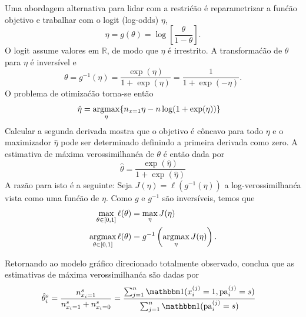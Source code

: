 \begin{exenumerate}
\begin{solution}
        Uma abordagem alternativa para lidar com a restri\'c\~ao \'e
        reparametrizar a fun\'c\~ao objetivo e trabalhar com o logit (log-odds) $\eta$,
        \begin{equation}
            \eta = g(\theta) = \log\left[ \frac{\theta}{1-\theta}\right].
        \end{equation}
        O logit assume valores em $\mathbb{R}$, de modo que $\eta$ \'e
        irrestrito. A transforma\'c\~ao de $\theta$ para $\eta$ \'e
        invers\'ivel e
        \begin{equation}
            \theta = g^{-1}(\eta) = \frac{\exp(\eta)}{1+\exp(\eta)} = \frac{1}{1+\exp(-\eta)}.
        \end{equation}
        O problema de otimiza\'c\~ao torna-se ent\~ao
        \begin{align*}
            \hat{\eta} &= \operatorname*{\mathrm{argmax}}_{\eta}  \{ n_{x=1} \eta - n \log(1+\exp(\eta)) \}
        \end{align*}
        Calcular a segunda derivada mostra que o objetivo \'e c\^oncavo
        para todo $\eta$ e o maximizador $\hat{\eta}$ pode ser determinado
        definindo a primeira derivada como zero. A estimativa de m\'axima
        verossimilhan\'ca de $\theta$ \'e ent\~ao dada por
        \begin{equation}
            \hat{\theta} = \frac{\exp(\hat{\eta})}{1+\exp(\hat{\eta})}
        \end{equation}
        A raz\~ao para isto \'e a seguinte: Seja $J(\eta) = \ell(
        g^{-1}(\eta))$ a log-verossimilhan\'ca vista como uma fun\'c\~ao de
        $\eta$. Como $g$ e $g^{-1}$ s\~ao invers\'iveis, temos que
        \begin{align}
            \max_{\theta \in [0,1]} \ell(\theta) &= \max_\eta J(\eta) \\
            \operatorname*{\mathrm{argmax}}_{\theta \in [0,1]} \ell(\theta) &= g^{-1}\left( \operatorname*{\mathrm{argmax}}_{\eta} J(\eta) \right).
        \end{align}
    \end{solution}
    
    \item Retornando ao modelo gr\'afico direcionado totalmente observado, conclua que as estimativas de m\'axima verossimilhan\'ca s\~ao dadas por
    \begin{align}
        \hat{\theta}_i^s &= \frac{n_{x_i=1}^s}{n_{x_i=1}^s+n_{x_i=0}^s} = \frac{ \sum_{j=1}^n\ind(x_i^{(j)}=1, \pa_i^{(j)}=s) }{ \sum_{j=1}^n\ind(\pa_i^{(j)}=s) }
    \end{align}
    

\end{exenumerate}
